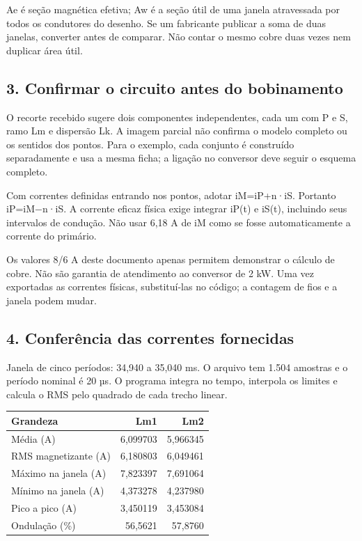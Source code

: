 \documentclass[
]{article}
\begin{document}
Ae é seção magnética efetiva; Aw é a seção útil de uma janela
atravessada por todos os condutores do desenho. Se um fabricante
publicar a soma de duas janelas, converter antes de comparar. Não contar
o mesmo cobre duas vezes nem duplicar área útil.

\subsection{3. Confirmar o circuito antes do
bobinamento}\label{confirmar-o-circuito-antes-do-bobinamento}

O recorte recebido sugere dois componentes independentes, cada um com P
e S, ramo Lm e dispersão Lk. A imagem parcial não confirma o modelo
completo ou os sentidos dos pontos. Para o exemplo, cada conjunto é
construído separadamente e usa a mesma ficha; a ligação no conversor
deve seguir o esquema completo.

Com correntes definidas entrando nos pontos, adotar iM=iP+n·iS. Portanto
iP=iM−n·iS. A corrente eficaz física exige integrar iP(t) e iS(t),
incluindo seus intervalos de condução. Não usar 6,18 A de iM como se
fosse automaticamente a corrente do primário.

Os valores 8/6 A deste documento apenas permitem demonstrar o cálculo de
cobre. Não são garantia de atendimento ao conversor de 2 kW. Uma vez
exportadas as correntes físicas, substituí-las no código; a contagem de
fios e a janela podem mudar.

\subsection{4. Conferência das correntes
fornecidas}\label{conferuxeancia-das-correntes-fornecidas}

Janela de cinco períodos: 34,940 a 35,040 ms. O arquivo tem 1.504
amostras e o período nominal é 20 µs. O programa integra no tempo,
interpola os limites e calcula o RMS pelo quadrado de cada trecho
linear.

\begin{longtable}[]{@{}lrr@{}}
\toprule\noalign{}
Grandeza & Lm1 & Lm2 \\
\midrule\noalign{}
\endhead
\bottomrule\noalign{}
\endlastfoot
Média (A) & 6,099703 & 5,966345 \\
RMS magnetizante (A) & 6,180803 & 6,049461 \\
Máximo na janela (A) & 7,823397 & 7,691064 \\
Mínimo na janela (A) & 4,373278 & 4,237980 \\
Pico a pico (A) & 3,450119 & 3,453084 \\
Ondulação (\%) & 56,5621 & 57,8760 \\
\end{longtable}
\end{document}
